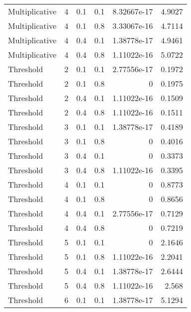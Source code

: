 \documentclass{article}
\begin{document}
\begin{figure}[H]
\begin{tabular}{lrrrrr}
 Multiplicative &       4 &   0.1 &            0.1 & 8.32667e-17 &            4.9027 \\
 Multiplicative &       4 &   0.1 &            0.8 & 3.33067e-16 &            4.7114 \\
 Multiplicative &       4 &   0.4 &            0.1 & 1.38778e-17 &            4.9461 \\
 Multiplicative &       4 &   0.4 &            0.8 & 1.11022e-16 &            5.0722 \\
 Threshold      &       2 &   0.1 &            0.1 & 2.77556e-17 &            0.1972 \\
 Threshold      &       2 &   0.1 &            0.8 & 0           &            0.1975 \\
 Threshold      &       2 &   0.4 &            0.1 & 1.11022e-16 &            0.1509 \\
 Threshold      &       2 &   0.4 &            0.8 & 1.11022e-16 &            0.1511 \\
 Threshold      &       3 &   0.1 &            0.1 & 1.38778e-17 &            0.4189 \\
 Threshold      &       3 &   0.1 &            0.8 & 0           &            0.4016 \\
 Threshold      &       3 &   0.4 &            0.1 & 0           &            0.3373 \\
 Threshold      &       3 &   0.4 &            0.8 & 1.11022e-16 &            0.3395 \\
 Threshold      &       4 &   0.1 &            0.1 & 0           &            0.8773 \\
 Threshold      &       4 &   0.1 &            0.8 & 0           &            0.8656 \\
 Threshold      &       4 &   0.4 &            0.1 & 2.77556e-17 &            0.7129 \\
 Threshold      &       4 &   0.4 &            0.8 & 0           &            0.7219 \\
 Threshold      &       5 &   0.1 &            0.1 & 0           &            2.1646 \\
 Threshold      &       5 &   0.1 &            0.8 & 1.11022e-16 &            2.2041 \\
 Threshold      &       5 &   0.4 &            0.1 & 1.38778e-17 &            2.6444 \\
 Threshold      &       5 &   0.4 &            0.8 & 1.11022e-16 &            2.568  \\
 Threshold      &       6 &   0.1 &            0.1 & 1.38778e-17 &            5.1294 \\

\end{tabular}
\end{figure}
\end{document}
